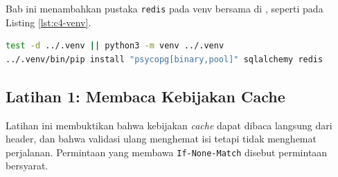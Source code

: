 Bab ini menambahkan pustaka \texttt{redis} pada venv bersama di
, seperti pada Listing \ref{lst:c4-venv}.

\begin{lstlisting}[language=bash, caption={Menyiapkan venv untuk seluruh skrip Python}, label={lst:c4-venv}]
test -d ../.venv || python3 -m venv ../.venv
../.venv/bin/pip install "psycopg[binary,pool]" sqlalchemy redis
\end{lstlisting}

\subsection*{Latihan 1: Membaca Kebijakan Cache}

Latihan ini membuktikan bahwa kebijakan \textit{cache} dapat dibaca langsung
dari header, dan bahwa validasi ulang menghemat isi tetapi tidak menghemat
perjalanan. Permintaan yang membawa \texttt{If-None-Match} disebut permintaan
bersyarat.

